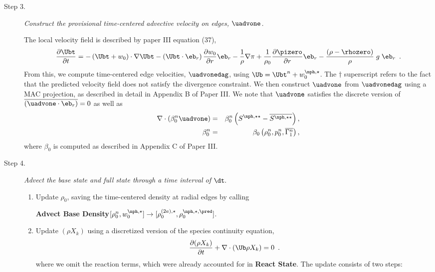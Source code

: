 \begin{description}
\item[Step 3.] {\em Construct the provisional time-centered advective velocity on 
edges, $\uadvone$.}

The local velocity field is described by paper III equation (37),
\begin{equation}
\frac{\partial\Ubt}{\partial t} = 
- \left(\Ubt+w_0\right) \cdot \nabla \Ubt
- \left(\Ubt \cdot \eb_r\right) \frac{\partial w_0}{\partial r} \eb_r
- \frac{1}{\rho} \nabla\pi
+ \frac{1}{\rho_0} \frac{\partial \pizero}{\partial r} \eb_r
- \frac{(\rho-\rhozero)}{\rho} \; g \; \eb_r  \label{eq:utildeupd}  \enskip .
\end{equation}
From this, we compute time-centered edge 
velocities, $\uadvonedag$, using 
$\Ub = \Ubt^n + w_0^{\nph,\star}$.  The $\dagger$ superscript refers to the 
fact that the predicted velocity field does not satisfy the divergence 
constraint.  We then construct $\uadvone$ from $\uadvonedag$
using a MAC projection, as described in detail in Appendix B of Paper III.  
We note that $\uadvone$ satisfies the discrete version of
$\overline{(\uadvone\cdot\eb_r)}=0$ as well as
\begin{eqnarray}
\nabla \cdot \left(\beta_0^n \uadvone\right) &=& \beta_0^n \left(S^{\nph,\star\star} - \overline{S^{\nph,\star\star}}\right),\\
 \beta_0^n &=& \beta_0 \left(\rho_0^n, p_0^n, \overline{\Gamma_1^n}\right),
\end{eqnarray}
where $\beta_0$ is computed as described in Appendix C of Paper III.

\item[Step 4.] {\em Advect the base state and full state through a time interval of $\dt.$}

\begin{enumerate}
\renewcommand{\theenumi}{{\bf \Alph{enumi}}}

\item Update $\rho_0$, saving the time-centered density at radial edges by calling

{\bf Advect Base Density}$[\rho_0^{n},w_0^{\nph,\star}] \rightarrow [\rho_0^{(2a),\star}, \rho_0^{\nph,\star,\pred}]$.

\item Update $(\rho X_k)$ using a discretized version of the species 
continuity equation,
\begin{equation}
\frac{\partial (\rho X_k)}{\partial t} + \nabla \cdot (\Ub \rho X_k) = 0 \enskip .
\label{eq:species}
\end{equation}
where we omit the reaction terms, which were already 
accounted for in {\bf React State}.  The update consists of two steps:


\end{enumerate}
\end{description}
